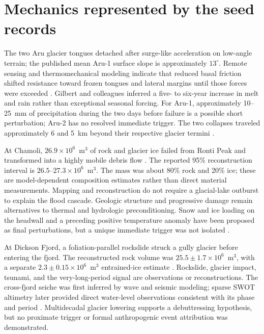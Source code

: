 \documentclass[11pt]{article}
\begin{document}
\section{Mechanics represented by the seed records}

The two Aru glacier tongues detached after surge-like acceleration on
low-angle terrain; the published mean Aru-1 surface slope is approximately
$13^\circ$. Remote sensing and thermomechanical modeling indicate
that reduced basal friction shifted resistance toward frozen tongues and
lateral margins until those forces were exceeded
\citep{Kaab2018,Gilbert2018}. Gilbert and colleagues inferred a five- to
six-year increase in melt and rain rather than exceptional seasonal forcing.
For Aru-1, approximately 10--25~mm of precipitation during the two days before
failure is a possible short perturbation; Aru-2 has no resolved immediate
trigger. The two collapses traveled approximately 6 and 5~km beyond their
respective glacier termini \citep{Kaab2018}.

At Chamoli, $26.9\times10^6$~m$^3$ of rock and glacier ice failed
from Ronti Peak and transformed into a highly mobile debris flow
\citep{Shugar2021}. The reported 95\% reconstruction interval is
$26.5$--$27.3\times10^6$~m$^3$. The mass was about 80\% rock and 20\% ice;
these are model-dependent composition estimates rather than direct material
measurements. Mapping and reconstruction do not require a glacial-lake
outburst to explain the flood cascade. Geologic structure and progressive
damage remain alternatives to thermal and hydrologic preconditioning. Snow
and ice loading on the headwall and a preceding positive temperature anomaly
have been proposed as final perturbations, but a unique immediate trigger was
not isolated \citep{VanWykDeVries2022}.

At Dickson Fjord, a foliation-parallel rockslide struck a gully glacier before
entering the fjord. The reconstructed rock volume was
$25.5\pm1.7\times10^6$~m$^3$, with a separate
$2.3\pm0.15\times10^6$~m$^3$ entrained-ice estimate
\citep{Svennevig2024}. Rockslide, glacier impact, tsunami, and the
very-long-period signal are observations or reconstructions. The cross-fjord
seiche was first inferred by wave and seismic modeling; sparse SWOT altimetry
later provided direct water-level observations consistent with its phase and
period \citep{Monahan2025}. Multidecadal glacier lowering supports a
debuttressing hypothesis, but no proximate trigger or formal anthropogenic
event attribution was demonstrated.
\end{document}
